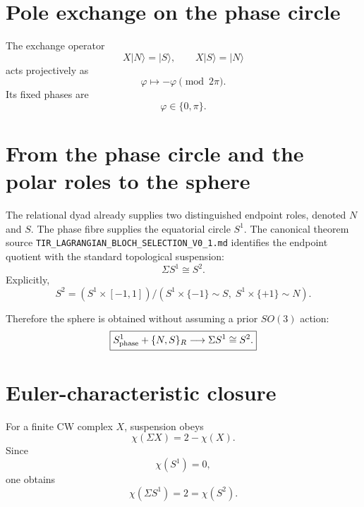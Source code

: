 \section{Pole exchange on the phase circle}

The exchange operator
\begin{equation}
X|N\rangle=|S\rangle,
\qquad
X|S\rangle=|N\rangle
\end{equation}
acts projectively as
\begin{equation}
\boxed{\varphi\mapsto-\varphi\pmod{2\pi}.}
\label{eq:v12_half_phase_exchange}
\end{equation}
Its fixed phases are
\begin{equation}
\boxed{\varphi\in\{0,\pi\}.}
\label{eq:v12_half_fixed_phases}
\end{equation}

\section{From the phase circle and the polar roles to the sphere}

The relational dyad already supplies two distinguished endpoint roles, denoted $N$ and $S$. The phase fibre supplies the equatorial circle $S^1$. The canonical theorem source \texttt{TIR\_LAGRANGIAN\_BLOCH\_SELECTION\_V0\_1.md} identifies the endpoint quotient with the standard topological suspension:
\begin{equation}
\boxed{\Sigma S^1\cong S^2.}
\label{eq:v12_suspension_s1_s2}
\end{equation}
Explicitly,
\begin{equation}
S^2
=
\left(S^1\times[-1,1]\right)\Big/
\left(
S^1\times\{-1\}\sim S,\;
S^1\times\{+1\}\sim N
\right).
\end{equation}

Therefore the sphere is obtained without assuming a prior $SO(3)$ action:
\begin{equation}
\boxed{
S^1_{\rm phase}+\{N,S\}_{R}
\longrightarrow
\Sigma S^1
\cong
S^2.
}
\label{eq:v12_phase_poles_sphere}
\end{equation}

\section{Euler-characteristic closure}

For a finite CW complex $X$, suspension obeys
\begin{equation}
\chi(\Sigma X)=2-\chi(X).
\end{equation}
Since
\begin{equation}
\chi(S^1)=0,
\end{equation}
one obtains
\begin{equation}
\boxed{\chi(\Sigma S^1)=2=\chi(S^2).}
\label{eq:v12_euler_characteristic_sphere}
\end{equation}


